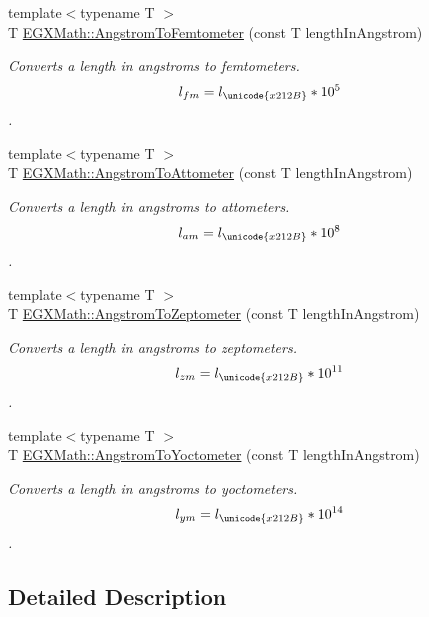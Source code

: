 \begin{DoxyCompactItemize}
{\footnotesize template$<$typename T $>$ }\\T \mbox{\hyperlink{group___e_g_x_math-_conversions-_length_conversions-_non-_s_i-_angstrom-_s_i_gae41b2173230daf03a14a4d917c988ffa}{E\+G\+X\+Math\+::\+Angstrom\+To\+Femtometer}} (const T length\+In\+Angstrom)
\begin{DoxyCompactList}\small\item\em Converts a length in angstroms to femtometers. \[ l_{fm}=l_{\unicode{x212B}} * 10^{5} \]. \end{DoxyCompactList}\item 
{\footnotesize template$<$typename T $>$ }\\T \mbox{\hyperlink{group___e_g_x_math-_conversions-_length_conversions-_non-_s_i-_angstrom-_s_i_ga9bb7edf645cb82492a8792132dbb74e6}{E\+G\+X\+Math\+::\+Angstrom\+To\+Attometer}} (const T length\+In\+Angstrom)
\begin{DoxyCompactList}\small\item\em Converts a length in angstroms to attometers. \[ l_{am}=l_{\unicode{x212B}} * 10^{8} \]. \end{DoxyCompactList}\item 
{\footnotesize template$<$typename T $>$ }\\T \mbox{\hyperlink{group___e_g_x_math-_conversions-_length_conversions-_non-_s_i-_angstrom-_s_i_ga2516c0f4dedd31c3803c05f4add3fa13}{E\+G\+X\+Math\+::\+Angstrom\+To\+Zeptometer}} (const T length\+In\+Angstrom)
\begin{DoxyCompactList}\small\item\em Converts a length in angstroms to zeptometers. \[ l_{zm}=l_{\unicode{x212B}} * 10^{11} \]. \end{DoxyCompactList}\item 
{\footnotesize template$<$typename T $>$ }\\T \mbox{\hyperlink{group___e_g_x_math-_conversions-_length_conversions-_non-_s_i-_angstrom-_s_i_ga3e889736a84a54f24aa20e218527521d}{E\+G\+X\+Math\+::\+Angstrom\+To\+Yoctometer}} (const T length\+In\+Angstrom)
\begin{DoxyCompactList}\small\item\em Converts a length in angstroms to yoctometers. \[ l_{ym}=l_{\unicode{x212B}} * 10^{14} \]. \end{DoxyCompactList}\end{DoxyCompactItemize}


\subsection{Detailed Description}


